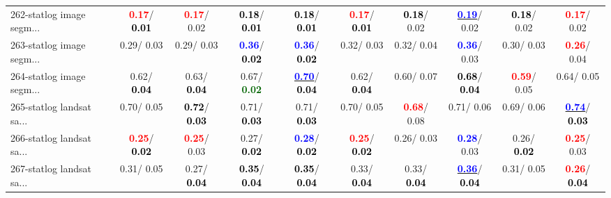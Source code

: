 \begin{table}[h]
\begin{center}
{\begin{tabular}{lc|c|c|c|c|c|c|c|c}
262-statlog image segm... & \textcolor{red}{\textbf{  0.17}}/\textcolor{black}{\textbf{  0.01}} & \textcolor{red}{\textbf{  0.17}}/  0.02 & \textcolor{black}{\textbf{  0.18}}/\textcolor{black}{\textbf{  0.01}} & \textcolor{black}{\textbf{  0.18}}/\textcolor{black}{\textbf{  0.01}} & \textcolor{red}{\textbf{  0.17}}/\textcolor{black}{\textbf{  0.01}} & \textcolor{black}{\textbf{  0.18}}/  0.02 & \underline{\textcolor{blue}{\textbf{  0.19}}}/  0.02 & \textcolor{black}{\textbf{  0.18}}/  0.02 & \textcolor{red}{\textbf{  0.17}}/  0.02 \\
263-statlog image segm... &   0.29/  0.03 &   0.29/  0.03 & \textcolor{blue}{\textbf{  0.36}}/\textcolor{black}{\textbf{  0.02}} & \textcolor{blue}{\textbf{  0.36}}/\textcolor{black}{\textbf{  0.02}} &   0.32/  0.03 &   0.32/  0.04 & \textcolor{blue}{\textbf{  0.36}}/  0.03 &   0.30/  0.03 & \textcolor{red}{\textbf{  0.26}}/  0.04 \\ \hline
264-statlog image segm... &   0.62/\textcolor{black}{\textbf{  0.04}} &   0.63/\textcolor{black}{\textbf{  0.04}} &   0.67/\textcolor{darkgreen}{\textbf{  0.02}} & \underline{\textcolor{blue}{\textbf{  0.70}}}/\textcolor{black}{\textbf{  0.04}} &   0.62/\textcolor{black}{\textbf{  0.04}} &   0.60/  0.07 & \textcolor{black}{\textbf{  0.68}}/\textcolor{black}{\textbf{  0.04}} & \textcolor{red}{\textbf{  0.59}}/  0.05 &   0.64/  0.05 \\
265-statlog landsat sa... &   0.70/  0.05 & \textcolor{black}{\textbf{  0.72}}/\textcolor{black}{\textbf{  0.03}} &   0.71/\textcolor{black}{\textbf{  0.03}} &   0.71/\textcolor{black}{\textbf{  0.03}} &   0.70/  0.05 & \textcolor{red}{\textbf{  0.68}}/  0.08 &   0.71/  0.06 &   0.69/  0.06 & \underline{\textcolor{blue}{\textbf{  0.74}}}/\textcolor{black}{\textbf{  0.03}} \\
266-statlog landsat sa... & \textcolor{red}{\textbf{  0.25}}/\textcolor{black}{\textbf{  0.02}} & \textcolor{red}{\textbf{  0.25}}/  0.03 &   0.27/\textcolor{black}{\textbf{  0.02}} & \textcolor{blue}{\textbf{  0.28}}/\textcolor{black}{\textbf{  0.02}} & \textcolor{red}{\textbf{  0.25}}/\textcolor{black}{\textbf{  0.02}} &   0.26/  0.03 & \textcolor{blue}{\textbf{  0.28}}/  0.03 &   0.26/\textcolor{black}{\textbf{  0.02}} & \textcolor{red}{\textbf{  0.25}}/  0.03 \\
267-statlog landsat sa... &   0.31/  0.05 &   0.27/\textcolor{black}{\textbf{  0.04}} & \textcolor{black}{\textbf{  0.35}}/\textcolor{black}{\textbf{  0.04}} & \textcolor{black}{\textbf{  0.35}}/\textcolor{black}{\textbf{  0.04}} &   0.33/\textcolor{black}{\textbf{  0.04}} &   0.33/\textcolor{black}{\textbf{  0.04}} & \underline{\textcolor{blue}{\textbf{  0.36}}}/\textcolor{black}{\textbf{  0.04}} &   0.31/  0.05 & \textcolor{red}{\textbf{  0.26}}/\textcolor{black}{\textbf{  0.04}} \\

\end{tabular}}
\end{center}
\end{table}
